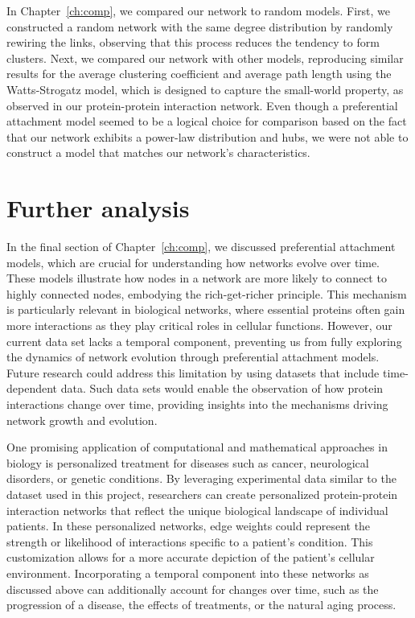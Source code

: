 \documentclass[paper=a4,fontsize=11pt,DIV=8,BCOR=5mm,oneside,pdftex,bibtotocnumbered]{scrreprt}
\theoremstyle{plain}
\begin{document}
	In Chapter~\ref{ch:comp}, we compared our network to random models. First, we constructed a random network with the same degree distribution by randomly rewiring the links, observing that this process reduces the tendency to form clusters. Next, we compared our network with other models, reproducing similar results for the average clustering coefficient and average path length using the Watts-Strogatz model, which is designed to capture the small-world property, as observed in our protein-protein interaction network. Even though a preferential attachment model seemed to be a logical choice for comparison based on the fact that our network exhibits a power-law distribution and hubs, we were not able to construct a model that matches our network's characteristics.
	
	\section{Further analysis}
	In the final section of Chapter~\ref{ch:comp}, we discussed preferential attachment models, which are crucial for understanding how networks evolve over time. These models illustrate how nodes in a network are more likely to connect to highly connected nodes, embodying the rich-get-richer principle. This mechanism is particularly relevant in biological networks, where essential proteins often gain more interactions as they play critical roles in cellular functions. However, our current data set lacks a temporal component, preventing us from fully exploring the dynamics of network evolution through preferential attachment models. Future research could address this limitation by using datasets that include time-dependent data. Such data sets would enable the observation of how protein interactions change over time, providing insights into the mechanisms driving network growth and evolution.
	
	One promising application of computational and mathematical approaches in biology is personalized treatment for diseases such as cancer, neurological disorders, or genetic conditions. By leveraging experimental data similar to the dataset used in this project, researchers can create personalized protein-protein interaction networks that reflect the unique biological landscape of individual patients. In these personalized networks, edge weights could represent the strength or likelihood of interactions specific to a patient's condition. This customization allows for a more accurate depiction of the patient's cellular environment. Incorporating a temporal component into these networks as discussed above can additionally account for changes over time, such as the progression of a disease, the effects of treatments, or the natural aging process.
	
\end{document}

